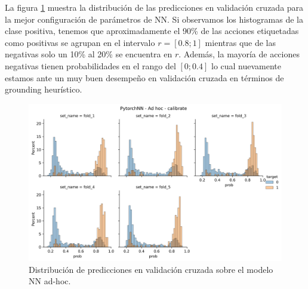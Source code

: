 La figura \ref{fig:calibrate-bestmodel-adhoc} muestra la distribución de las
predicciones en validación cruzada para la mejor configuración de parámetros de
NN. Si observamos los histogramas de la clase positiva, tenemos que
aproximadamente el 90\% de las acciones etiquetadas como positivas se agrupan en
el intervalo $r = [0.8; 1]$ mientras que de las negativas solo un 10\% al 20\%
se encuentra en $r$. Además, la mayoría de acciones negativas tienen
probabilidades en el rango del $[0;0.4]$ lo cual nuevamente estamos ante un muy
buen desempeño en validación cruzada en términos de grounding heurístico.

\begin{figure}[b!]
    \centering
    \includegraphics[width=\linewidth]{figures/results/ad-hoc/nn/calibrate/nn_adhoc_calibrate.png}
    \caption{Distribución de predicciones en validación cruzada sobre el modelo NN ad-hoc.}
    \label{fig:calibrate-bestmodel-adhoc}
\end{figure}

